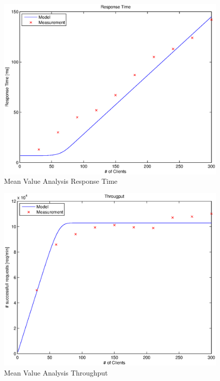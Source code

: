 \documentclass[a4paper]{article}
\begin{document}

\begin{figure}[H]
	\begin{center}
    \includegraphics[scale=0.6]{../plots-ms2-mg/mva-rt.eps}
  \end{center}
  \caption{Mean Value Analysis Response Time}
  \label{fig:mva-rt}
\end{figure}



\begin{figure}[H]
	\begin{center}
    \includegraphics[scale=0.6]{../plots-ms2-mg/mva-tp.eps}
  \end{center}
  \caption{Mean Value Analysis Throughput}
  \label{fig:mva-tp}
\end{figure}
\end{document}
